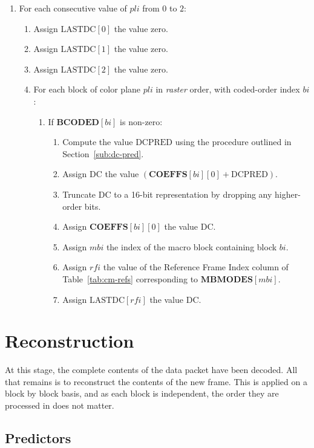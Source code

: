 \documentclass[9pt,letterpaper]{book}
\newcommand{\idx}[1]{{\ensuremath{\mathit{#1}}}}
\newcommand{\pli}{\idx{pli}}
\newcommand{\bi}{\idx{bi}}
\newcommand{\mbi}{\idx{mbi}}
\newcommand{\rfi}{\idx{rfi}}
\newcommand{\bitvar}[1]{\ensuremath{\mathbf{\bm{#1}}}}
\newcommand{\locvar}[1]{\ensuremath{\mathrm{#1}}}
\numberwithin{equation}{chapter}
\numberwithin{figure}{chapter}
\numberwithin{table}{chapter}
\begin{document}
\begin{enumerate}
\item
For each consecutive value of \locvar{\pli} from $0$ to $2$:
\begin{enumerate}
\item
Assign $\locvar{LASTDC}[0]$ the value zero.
\item
Assign $\locvar{LASTDC}[1]$ the value zero.
\item
Assign $\locvar{LASTDC}[2]$ the value zero.
\item
For each block of color plane \locvar{\pli} in {\em raster} order, with
 coded-order index \locvar{\bi}:
\begin{enumerate}
\item
If $\bitvar{BCODED}[\locvar{\bi}]$ is non-zero:
\begin{enumerate}
\item
Compute the value \locvar{DCPRED} using the procedure outlined in
 Section~\ref{sub:dc-pred}.
\item
Assign \locvar{DC} the value
 $(\bitvar{COEFFS}[\locvar{\bi}][0]+\locvar{DCPRED})$.
\item
Truncate \locvar{DC} to a 16-bit representation by dropping any higher-order
 bits.
\item
Assign $\bitvar{COEFFS}[\locvar{\bi}][0]$ the value \locvar{DC}.
\item
Assign \locvar{\mbi} the index of the macro block containing block
 \locvar{\bi}.
\item
Assign \locvar{\rfi} the value of the Reference Frame Index column of
 Table~\ref{tab:cm-refs} corresponding to $\bitvar{MBMODES}[\locvar{\mbi}]$.
\item
Assign $\locvar{LASTDC}[\rfi]$ the value $\locvar{DC}$.
\end{enumerate}
\end{enumerate}
\end{enumerate}
\end{enumerate}

\section{Reconstruction}

At this stage, the complete contents of the data packet have been decoded.
All that remains is to reconstruct the contents of the new frame.
This is applied on a block by block basis, and as each block is independent,
 the order they are processed in does not matter.

\subsection{Predictors}
\label{sec:predictors}
\end{document}
